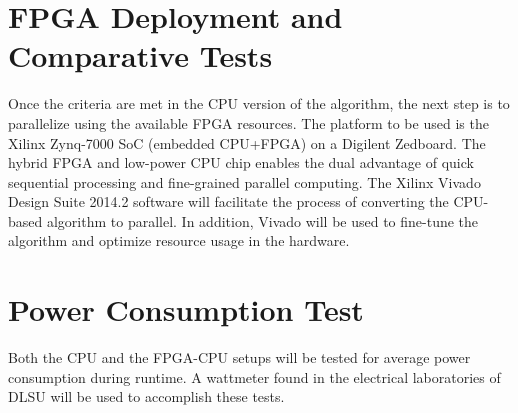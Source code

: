 \section{FPGA Deployment and Comparative Tests}
Once the criteria are met in the CPU version of the algorithm, the next step is to parallelize using the available FPGA resources.
The platform to be used is the Xilinx Zynq-7000 SoC (embedded CPU+FPGA) on a Digilent Zedboard.
The hybrid FPGA and low-power CPU chip enables the dual advantage of quick sequential processing and fine-grained parallel computing.
The Xilinx Vivado Design Suite 2014.2 software will facilitate the process of converting the CPU-based algorithm to parallel.
In addition, Vivado will be used to fine-tune the algorithm and optimize resource usage in the hardware.

\section{Power Consumption Test}
Both the CPU and the FPGA-CPU setups will be tested for average power consumption during runtime. A wattmeter found in the electrical laboratories of DLSU will be used to accomplish these tests.



